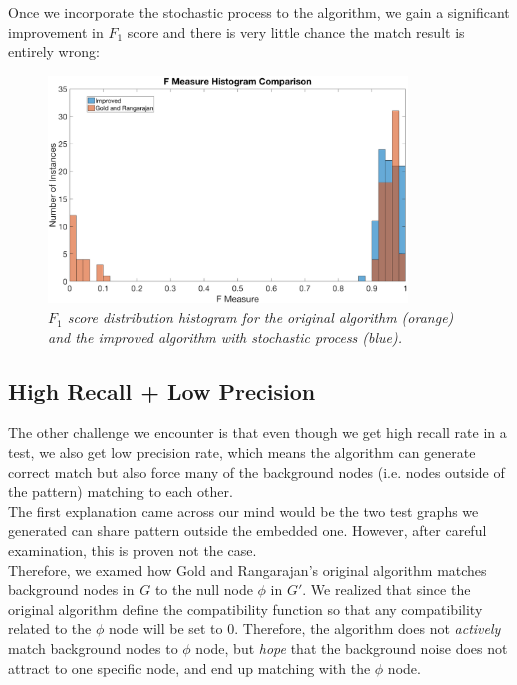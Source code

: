 Once we incorporate the stochastic process to the algorithm, we gain a significant improvement in $F_1$ score and there is very little chance the match result is entirely wrong:

\begin{figure}[h]
	\centering
	\captionsetup{justification=centering}
	\includegraphics[width=0.85\textwidth]{figs/s_improved.png}
	\caption[Caption for LOF]{\emph{$F_1$ score distribution histogram for the original algorithm (orange) and the improved algorithm with stochastic process (blue).}}
	\label{fig:s_improved}
\end{figure}

\subsection{High Recall + Low Precision}
\label{ssec:nullnode}

The other challenge we encounter is that even though we get high recall rate in a test, we also get low precision rate, which means the algorithm can generate correct match but also force many of the background nodes (i.e. nodes outside of the pattern) matching  to each other.\\

The first explanation came across our mind would be the two test graphs we generated can share pattern outside the embedded one. However, after careful examination, this is proven not the case.\\

Therefore, we examed how Gold and Rangarajan's original algorithm matches background nodes in $G$ to the null node $\phi$ in $G'$. We realized that since the original algorithm define the compatibility function so that any compatibility related to the $\phi$ node will be set to 0. Therefore, the algorithm does not \emph{actively} match background nodes to  $\phi$ node, but \emph{hope} that the background noise does not attract to one specific node, and end up matching with the $\phi$ node.\\

